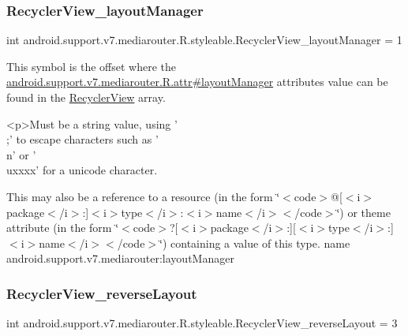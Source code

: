 \subsubsection{\texorpdfstring{Recycler\+View\+\_\+layout\+Manager}{RecyclerView\_layoutManager}}
{\footnotesize\ttfamily int android.\+support.\+v7.\+mediarouter.\+R.\+styleable.\+Recycler\+View\+\_\+layout\+Manager = 1\hspace{0.3cm}{\ttfamily [static]}}

This symbol is the offset where the \hyperlink{classandroid_1_1support_1_1v7_1_1mediarouter_1_1R_1_1attr_addc0eec1b634e205b041747ea0e287ee}{android.\+support.\+v7.\+mediarouter.\+R.\+attr\#layout\+Manager} attribute\textquotesingle{}s value can be found in the \hyperlink{classandroid_1_1support_1_1v7_1_1mediarouter_1_1R_1_1styleable_af634dfe19333cdc00d399d1f00635e93}{Recycler\+View} array.

\begin{DoxyVerb}      <p>Must be a string value, using '\\;' to escape characters such as '\\n' or '\\uxxxx' for a unicode character.
\end{DoxyVerb}
 

This may also be a reference to a resource (in the form \char`\"{}$<$code$>$@\mbox{[}$<$i$>$package$<$/i$>$\+:\mbox{]}$<$i$>$type$<$/i$>$\+:$<$i$>$name$<$/i$>$$<$/code$>$\char`\"{}) or theme attribute (in the form \char`\"{}$<$code$>$?\mbox{[}$<$i$>$package$<$/i$>$\+:\mbox{]}\mbox{[}$<$i$>$type$<$/i$>$\+:\mbox{]}$<$i$>$name$<$/i$>$$<$/code$>$\char`\"{}) containing a value of this type.  name android.\+support.\+v7.\+mediarouter\+:layout\+Manager \mbox{\label{classandroid_1_1support_1_1v7_1_1mediarouter_1_1R_1_1styleable_a80fce516766d6c33a441eea5da180b7b}} 
\subsubsection{\texorpdfstring{Recycler\+View\+\_\+reverse\+Layout}{RecyclerView\_reverseLayout}}
{\footnotesize\ttfamily int android.\+support.\+v7.\+mediarouter.\+R.\+styleable.\+Recycler\+View\+\_\+reverse\+Layout = 3\hspace{0.3cm}{\ttfamily [static]}}


